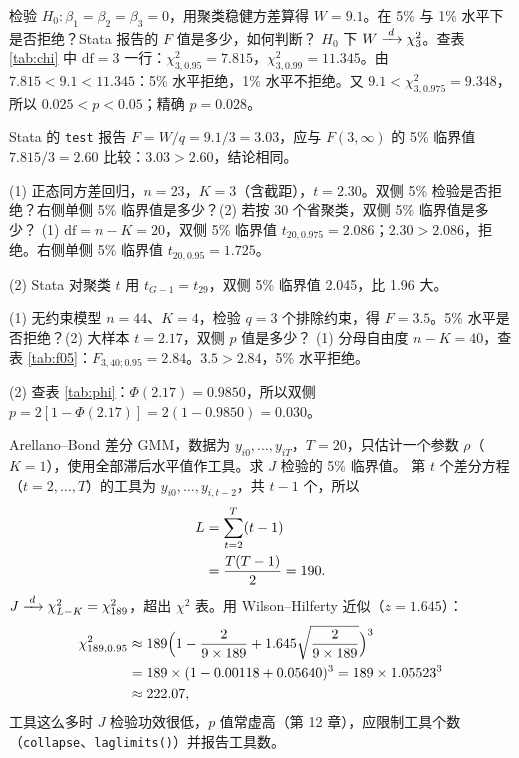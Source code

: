 \begin{exmp}[Wald 检验，\texorpdfstring{$q=3$}{q=3}]
检验 $H_0:\beta_1=\beta_2=\beta_3=0$，用聚类稳健方差算得 $W=9.1$。在 5\% 与 1\% 水平下是否拒绝？Stata 报告的 $F$ 值是多少，如何判断？
\solution
$H_0$ 下 $W\dto\chi^2_3$。查表 \ref{tab:chi} 中 $\mathrm{df}=3$ 一行：$\chi^2_{3,0.95}=7.815$，$\chi^2_{3,0.99}=11.345$。由 $7.815<9.1<11.345$：5\% 水平拒绝，1\% 水平不拒绝。又 $9.1<\chi^2_{3,0.975}=9.348$，所以 $0.025<p<0.05$；精确 $p=0.028$。

Stata 的 \texttt{test} 报告 $F=W/q=9.1/3=3.03$，应与 $F(3,\infty)$ 的 5\% 临界值 $7.815/3=2.60$ 比较：$3.03>2.60$，结论相同。
\end{exmp}

\begin{exmp}
(1) 正态同方差回归，$n=23$，$K=3$（含截距），$t=2.30$。双侧 5\% 检验是否拒绝？右侧单侧 5\% 临界值是多少？(2) 若按 30 个省聚类，双侧 5\% 临界值是多少？
\solution
(1) $\mathrm{df}=n-K=20$，双侧 5\% 临界值 $t_{20,0.975}=2.086$；$2.30>2.086$，拒绝。右侧单侧 5\% 临界值 $t_{20,0.95}=1.725$。

(2) Stata 对聚类 $t$ 用 $t_{G-1}=t_{29}$，双侧 5\% 临界值 2.045，比 1.96 大。
\end{exmp}

\begin{exmp}
(1) 无约束模型 $n=44$、$K=4$，检验 $q=3$ 个排除约束，得 $F=3.5$。5\% 水平是否拒绝？(2) 大样本 $t=2.17$，双侧 $p$ 值是多少？
\solution
(1) 分母自由度 $n-K=40$，查表 \ref{tab:f05}：$F_{3,40;0.95}=2.84$。$3.5>2.84$，5\% 水平拒绝。

(2) 查表 \ref{tab:phi}：$\Phi(2.17)=0.9850$，所以双侧 $p=2[1-\Phi(2.17)]=2(1-0.9850)=0.030$。
\end{exmp}

\begin{exmp}
Arellano--Bond 差分 GMM，数据为 $y_{i0},\dots,y_{iT}$，$T=20$，只估计一个参数 $\rho$（$K=1$），使用全部滞后水平值作工具。求 $J$ 检验的 5\% 临界值。
\solution
第 $t$ 个差分方程（$t=2,\dots,T$）的工具为 $y_{i0},\dots,y_{i,t-2}$，共 $t-1$ 个，所以
\begin{align*}
L&=\sum_{t=2}^{T}(t-1) \why{逐个方程数工具}\\
&=\frac{T(T-1)}{2}=190. \why{$T=20$}
\end{align*}
$J\dto\chi^2_{L-K}=\chi^2_{189}$，超出 $\chi^2$ 表。用 Wilson--Hilferty 近似（$z=1.645$）：
\begin{align*}
\chi^2_{189,0.95}&\approx 189\Bigl(1-\frac{2}{9\times189}+1.645\sqrt{\frac{2}{9\times189}}\Bigr)^3 \why{Wilson--Hilferty}\\
&=189\times(1-0.00118+0.05640)^3=189\times1.05523^3 \why{逐项计算}\\
&\approx 222.07, \why{精确值 222.08}
\end{align*}
工具这么多时 $J$ 检验功效很低，$p$ 值常虚高（第 12 章），应限制工具个数（\texttt{collapse}、\texttt{laglimits()}）并报告工具数。
\end{exmp}
\fi
